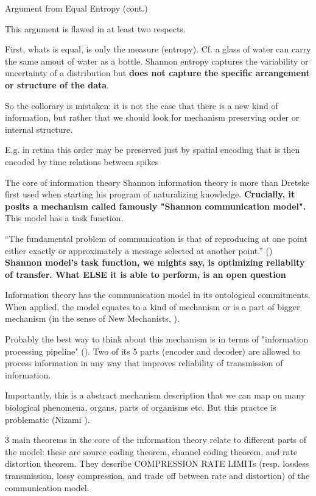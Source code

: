 \documentclass[10pt, aspectratio=169]{beamer}
\begin{document}
\begin{frame}[label=equal_entropy_cont]{Argument from Equal Entropy (cont.)}    
       
This argument is flawed in at least two respects.

First, whats is equal, is only the measure (entropy). Cf. a glass of water can carry the same amout of water as a bottle.    Shannon entropy captures the variability or uncertainty of a distribution but \textbf{does not capture the specific arrangement or structure of the data}.


    So the collorary is mistaken: it is not the case that there is a new kind of information, but rather that we should look for mechanism preserving order  or internal structure.

    E.g. in retina this order may be preserved just by spatial encoding that is then encoded by time relations between spikes

   


\end{frame}




\begin{frame}[label=core_info]{The core of information theory}
Shannon information theory is more than Dretske  first used when starting his program of naturalizing knowledge.  
    \textbf{Crucially, it posits a mechanism called famously "Shannon communication model".}  This model has a task function.

“The fundamental problem of communication is that of reproducing
at one point either exactly or approximately a message selected at
another point.” (\cite{shannon_mathematical_1948})
\textbf{
Shannon model's task function, we mights say, is  optimizing reliabilty of transfer. What ELSE it is able to perform, is an open question}
    
Information theory has the communication model in its ontological commitments. When applied, the model equates to a kind of mechanism or is a part of bigger mechanism (in the sense of New Mechanists, \cite{machamer_thinking_2000,glennan_rethinking_2002}).
    
    Probably the best way to think about this mechanism is in terms of "information processing pipeline" (\cite{martinez_representations_2019}).
    Two of its 5 parts (encoder and decoder) are allowed to process information in any way that improves reliability of transmission of information.

    Importantly, this is a abstract mechanism description that we can map on many biological phenomena, organs, parts of organisms etc. But this practce is problematic (Nizami \cite{nizami_information_2019}).

    3 main theorems in the core of the information theory  relate to  different parts of the model: these are source coding theorem, channel coding theorem, and rate distortion theorem. They describe COMPRESSION  RATE LIMITs (resp. lossless transmission, lossy compression, and trade off between rate and distortion) of the communication model.


\end{frame}
\end{document}
